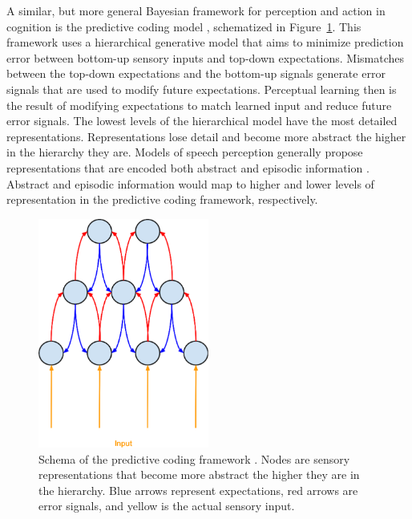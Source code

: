 A similar, but more general Bayesian framework for perception and action in cognition is the predictive coding model \citep{Clark2013}, schematized in Figure~\ref{fig:predictivecoding}.
This framework uses a hierarchical generative model that aims to minimize prediction error between bottom-up sensory inputs and top-down expectations.  
Mismatches between the top-down expectations and the bottom-up signals generate error signals that are used to modify future expectations.  
Perceptual learning then is the result of modifying expectations to match learned input and reduce future error signals.
The lowest levels of the hierarchical model have the most detailed representations.
Representations lose detail and become more abstract the higher in the hierarchy they are.
Models of speech perception generally propose representations that are encoded both abstract and episodic information \citep[e.g.][]{McLennan2003}.
Abstract and episodic information would map to higher and lower levels of representation in the predictive coding framework, respectively.

\begin{figure}[!ht]
\caption{Schema of the predictive coding framework \citep{Clark2013}.  Nodes are sensory representations that become more abstract the higher they are in the hierarchy. Blue arrows represent expectations, red arrows are error signals, and yellow is the actual sensory input.}
\label{fig:predictivecoding}
\begin{center}
\includegraphics[width=0.5\textwidth]{pictures/predictive_coding}
\end{center}
\end{figure}

